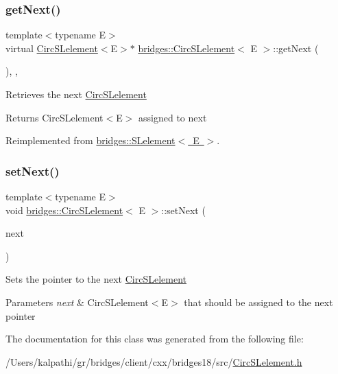 \subsubsection{\texorpdfstring{get\+Next()}{getNext()}}
{\footnotesize\ttfamily template$<$typename E$>$ \\
virtual \mbox{\hyperlink{classbridges_1_1_circ_s_lelement}{Circ\+S\+Lelement}}$<$E$>$$\ast$ \mbox{\hyperlink{classbridges_1_1_circ_s_lelement}{bridges\+::\+Circ\+S\+Lelement}}$<$ E $>$\+::get\+Next (\begin{DoxyParamCaption}{ }\end{DoxyParamCaption})\hspace{0.3cm}{\ttfamily [inline]}, {\ttfamily [override]}, {\ttfamily [virtual]}}

Retrieves the next \mbox{\hyperlink{classbridges_1_1_circ_s_lelement}{Circ\+S\+Lelement}} \begin{DoxyReturn}{Returns}
Circ\+S\+Lelement$<$\+E$>$ assigned to next 
\end{DoxyReturn}


Reimplemented from \mbox{\hyperlink{classbridges_1_1_s_lelement_a5bd74108a9aa49339378bf62cdbb19ca}{bridges\+::\+S\+Lelement$<$ E $>$}}.

\mbox{\label{classbridges_1_1_circ_s_lelement_a7b2512dd1cc559f0a89d9ab4aafed172}} 
\subsubsection{\texorpdfstring{set\+Next()}{setNext()}}
{\footnotesize\ttfamily template$<$typename E$>$ \\
void \mbox{\hyperlink{classbridges_1_1_circ_s_lelement}{bridges\+::\+Circ\+S\+Lelement}}$<$ E $>$\+::set\+Next (\begin{DoxyParamCaption}\item[{\mbox{\hyperlink{classbridges_1_1_circ_s_lelement}{Circ\+S\+Lelement}}$<$ E $>$ $\ast$}]{next }\end{DoxyParamCaption})\hspace{0.3cm}{\ttfamily [inline]}}

Sets the pointer to the next \mbox{\hyperlink{classbridges_1_1_circ_s_lelement}{Circ\+S\+Lelement}} 
\begin{DoxyParams}{Parameters}
{\em next} & Circ\+S\+Lelement$<$\+E$>$ that should be assigned to the next pointer \\
\hline
\end{DoxyParams}


The documentation for this class was generated from the following file\+:\begin{DoxyCompactItemize}
\item 
/\+Users/kalpathi/gr/bridges/client/cxx/bridges18/src/\mbox{\hyperlink{_circ_s_lelement_8h}{Circ\+S\+Lelement.\+h}}\end{DoxyCompactItemize}
